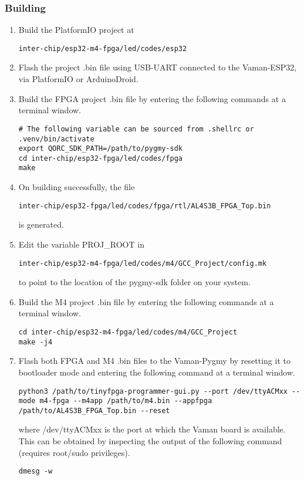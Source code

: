 \subsubsection{Building}
\begin{enumerate}
    \item Build the PlatformIO project at
    \begin{lstlisting}
inter-chip/esp32-m4-fpga/led/codes/esp32
    \end{lstlisting}
    \item Flash the project .bin file using USB-UART connected to the 
    Vaman-ESP32, via PlatformIO or ArduinoDroid.
    \item Build the FPGA project .bin file by entering the following commands at
    a terminal window.
    \begin{lstlisting}
# The following variable can be sourced from .shellrc or .venv/bin/activate
export QORC_SDK_PATH=/path/to/pygmy-sdk
cd inter-chip/esp32-fpga/led/codes/fpga
make
    \end{lstlisting}
    \item On building successfully, the file
    \begin{lstlisting}
inter-chip/esp32-fpga/led/codes/fpga/rtl/AL4S3B_FPGA_Top.bin
    \end{lstlisting}
    is generated.
    \item Edit the variable PROJ\_ROOT in
    \begin{lstlisting}
inter-chip/esp32-m4-fpga/led/codes/m4/GCC_Project/config.mk
    \end{lstlisting}
    to point to the location of the pygmy-sdk folder on your system.
    \item Build the M4 project .bin file by entering the following commands at a
    terminal window.
    \begin{lstlisting}
cd inter-chip/esp32-m4-fpga/led/codes/m4/GCC_Project
make -j4
    \end{lstlisting}
    \item Flash both FPGA and M4 .bin files to the Vaman-Pygmy by resetting it
    to bootloader mode and entering the following command at a terminal window.
    \begin{lstlisting}
python3 /path/to/tinyfpga-programmer-gui.py --port /dev/ttyACMxx --mode m4-fpga --m4app /path/to/m4.bin --appfpga /path/to/AL4S3B_FPGA_Top.bin --reset
    \end{lstlisting}
    where /dev/ttyACMxx is the port at which the Vaman board is available. This
    can be obtained by inspecting the output of the following command (requires
    root/sudo privileges).
    \begin{lstlisting}
dmesg -w
    \end{lstlisting}
\end{enumerate}

